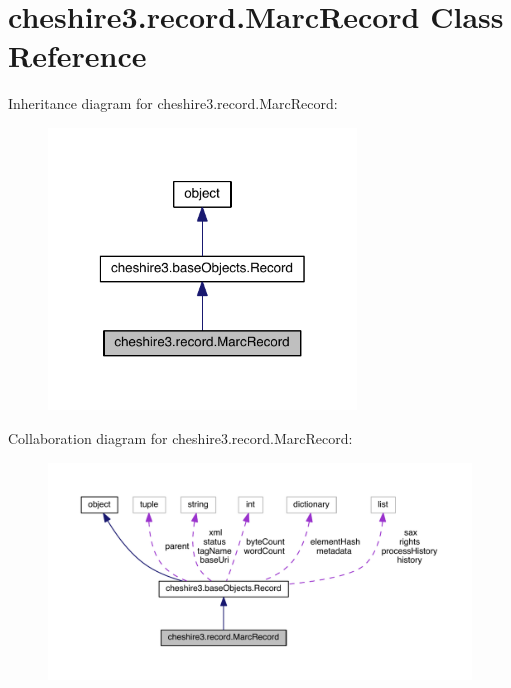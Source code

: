 \hypertarget{classcheshire3_1_1record_1_1_marc_record}{\section{cheshire3.\-record.\-Marc\-Record Class Reference}
\label{classcheshire3_1_1record_1_1_marc_record}
}


Inheritance diagram for cheshire3.\-record.\-Marc\-Record\-:
\nopagebreak
\begin{figure}[H]
\begin{center}
\leavevmode
\includegraphics[width=232pt]{classcheshire3_1_1record_1_1_marc_record__inherit__graph}
\end{center}
\end{figure}


Collaboration diagram for cheshire3.\-record.\-Marc\-Record\-:
\nopagebreak
\begin{figure}[H]
\begin{center}
\leavevmode
\includegraphics[width=350pt]{classcheshire3_1_1record_1_1_marc_record__coll__graph}
\end{center}
\end{figure}
